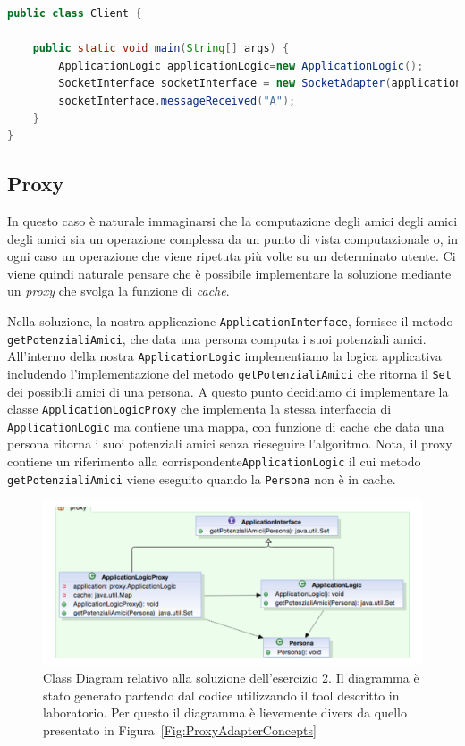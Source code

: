 \documentclass{article}
\begin{document}
\begin{lstlisting}[language=Java]
public class Client {

	public static void main(String[] args) {
		ApplicationLogic applicationLogic=new ApplicationLogic();
		SocketInterface socketInterface = new SocketAdapter(applicationLogic);
		socketInterface.messageReceived("A");
	}
}
\end{lstlisting}


\subsection{Proxy}

In questo caso \`e naturale immaginarsi che la computazione degli amici degli amici degli amici sia un operazione complessa da un punto di vista computazionale o, in ogni caso un operazione che viene ripetuta pi\`u volte su un determinato utente. Ci viene quindi naturale pensare che \`e possibile implementare la soluzione mediante un \emph{proxy} che svolga la funzione di \emph{cache}. 

Nella soluzione, la nostra applicazione \texttt{ApplicationInterface}, fornisce il metodo \texttt{getPotenzialiAmici}, che data una persona computa i suoi potenziali amici. All'interno della nostra \texttt{ApplicationLogic} implementiamo la logica applicativa includendo l'implementazione del metodo \texttt{getPotenzialiAmici} che ritorna il \texttt{Set} dei possibili amici di una persona. A questo punto decidiamo di implementare la classe \texttt{ApplicationLogicProxy} che implementa la stessa interfaccia di \texttt{ApplicationLogic} ma contiene una mappa, con funzione di cache che data una persona ritorna i suoi potenziali amici senza rieseguire l'algoritmo. Nota, il proxy contiene un riferimento alla corrispondente\texttt{ApplicationLogic} il cui metodo \texttt{getPotenzialiAmici} viene eseguito quando la \texttt{Persona} non \`e in cache.


\begin{figure}[h]
\includegraphics[width=1\textwidth]{Img/ProxyEsercizio1.pdf}
\caption{Class Diagram relativo alla soluzione dell'esercizio 2. Il diagramma \`e stato generato partendo dal codice utilizzando il tool descritto in laboratorio. Per questo il diagramma \`e lievemente divers da quello presentato in Figura~\ref{Fig:ProxyAdapterConcepts}}
\label{Fig:ProxyEsercizio1}
\end{figure}
\end{document}
